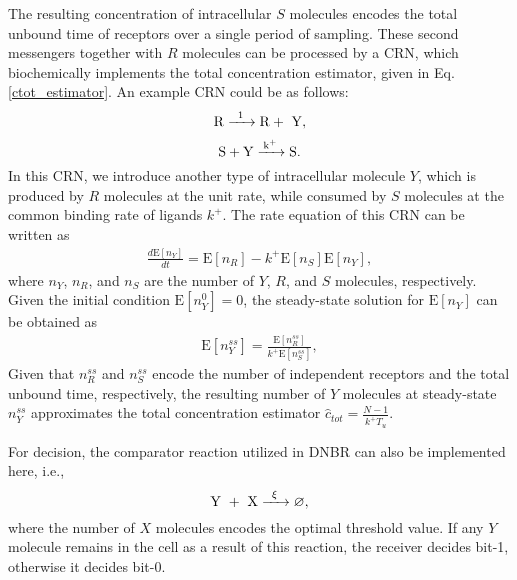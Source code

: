 \documentclass[twocolumn]{IEEEtran}
\newcommand{\E}{\mathrm{E}}
\begin{document}
The resulting concentration of intracellular $S$ molecules encodes the total unbound time of receptors over a single period of sampling. These second messengers together with $R$ molecules can be processed by a CRN, which biochemically implements the total concentration estimator, given in Eq. \eqref{ctot_estimator}. An example CRN could be as follows: 
\begin{equation}
\ce{ {R} ->[{1}] {R} + { Y} },
\end{equation}
\begin{equation}
\ce{ S + Y ->[{k^+}] S }.
\end{equation}
In this CRN, we introduce another type of intracellular molecule $Y$, which is produced by $R$ molecules at the unit rate, while consumed by $S$ molecules at the common binding rate of ligands $k^+$. The rate equation of this CRN can be written as
\begin{align}
\frac{d\E[ n_{Y}] }{dt} = \E[n_{R}]  - k^+ \E[n_{S}]  \E[ n_{Y}], 
\end{align}
where $n_Y$, $n_R$, and $n_S$ are the number of $Y$, $R$, and $S$ molecules, respectively. Given the initial condition $\E[ n_{Y}^0] = 0$, the steady-state solution for $\E[ n_{Y}]$ can be obtained as
\begin{align}
\E[ n_{Y}^{ss}] = \frac{\E[n_{R}^{ss}]}{k^+ \E[n_{S}^{ss}]}, 
\end{align}
Given that $n_R^{ss}$ and $n_S^{ss}$ encode the number of independent receptors and the total unbound time, respectively, the resulting number of $Y$ molecules at steady-state $n_Y^{ss}$ approximates the total concentration estimator $\hat{c}_{tot} = \frac{N-1}{k^+ T_u}$.  


For decision, the comparator reaction utilized in DNBR can also be implemented here, i.e., 
\begin{equation}
\ce{ {Y + X} ->[{\xi}] {\varnothing} },
\end{equation}
where the number of $X$ molecules encodes the optimal threshold value. If any $Y$ molecule remains in the cell as a result of this reaction, the receiver decides bit-1, otherwise it decides bit-0.

%
%
%
%
\end{document}
